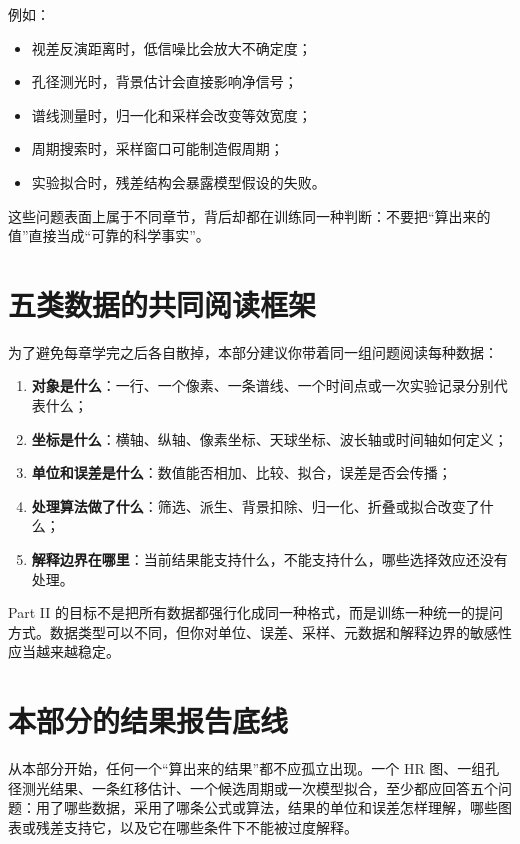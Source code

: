 例如：

\begin{itemize}
    \item 视差反演距离时，低信噪比会放大不确定度；
    \item 孔径测光时，背景估计会直接影响净信号；
    \item 谱线测量时，归一化和采样会改变等效宽度；
    \item 周期搜索时，采样窗口可能制造假周期；
    \item 实验拟合时，残差结构会暴露模型假设的失败。
\end{itemize}

这些问题表面上属于不同章节，背后却都在训练同一种判断：不要把“算出来的值”直接当成“可靠的科学事实”。

\section*{五类数据的共同阅读框架}

为了避免每章学完之后各自散掉，本部分建议你带着同一组问题阅读每种数据：

\begin{enumerate}
    \item \textbf{对象是什么}：一行、一个像素、一条谱线、一个时间点或一次实验记录分别代表什么；
    \item \textbf{坐标是什么}：横轴、纵轴、像素坐标、天球坐标、波长轴或时间轴如何定义；
    \item \textbf{单位和误差是什么}：数值能否相加、比较、拟合，误差是否会传播；
    \item \textbf{处理算法做了什么}：筛选、派生、背景扣除、归一化、折叠或拟合改变了什么；
    \item \textbf{解释边界在哪里}：当前结果能支持什么，不能支持什么，哪些选择效应还没有处理。
\end{enumerate}

\begin{protip}
Part II 的目标不是把所有数据都强行化成同一种格式，而是训练一种统一的提问方式。数据类型可以不同，但你对单位、误差、采样、元数据和解释边界的敏感性应当越来越稳定。
\end{protip}

\section*{本部分的结果报告底线}

从本部分开始，任何一个“算出来的结果”都不应孤立出现。一个 HR 图、一组孔径测光结果、一条红移估计、一个候选周期或一次模型拟合，至少都应回答五个问题：用了哪些数据，采用了哪条公式或算法，结果的单位和误差怎样理解，哪些图表或残差支持它，以及它在哪些条件下不能被过度解释。

